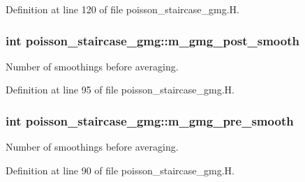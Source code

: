 Definition at line 120 of file poisson\+\_\+staircase\+\_\+gmg.\+H.

\subsubsection[{\texorpdfstring{m\+\_\+gmg\+\_\+post\+\_\+smooth}{m_gmg_post_smooth}}]{\setlength{\rightskip}{0pt plus 5cm}int poisson\+\_\+staircase\+\_\+gmg\+::m\+\_\+gmg\+\_\+post\+\_\+smooth\hspace{0.3cm}{\ttfamily [protected]}}\hypertarget{classpoisson__staircase__gmg_a043aadcdfe43ebf64be4e1394a75e0f9}{}\label{classpoisson__staircase__gmg_a043aadcdfe43ebf64be4e1394a75e0f9}


Number of smoothings before averaging. 



Definition at line 95 of file poisson\+\_\+staircase\+\_\+gmg.\+H.

\subsubsection[{\texorpdfstring{m\+\_\+gmg\+\_\+pre\+\_\+smooth}{m_gmg_pre_smooth}}]{\setlength{\rightskip}{0pt plus 5cm}int poisson\+\_\+staircase\+\_\+gmg\+::m\+\_\+gmg\+\_\+pre\+\_\+smooth\hspace{0.3cm}{\ttfamily [protected]}}\hypertarget{classpoisson__staircase__gmg_ab808d62e409de3509aa98b3503ed4169}{}\label{classpoisson__staircase__gmg_ab808d62e409de3509aa98b3503ed4169}


Number of smoothings before averaging. 



Definition at line 90 of file poisson\+\_\+staircase\+\_\+gmg.\+H.

